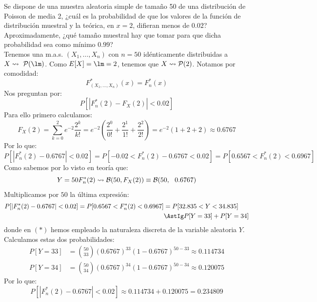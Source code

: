 \begin{ejercicio}
    Se dispone de una muestra aleatoria simple de tamaño 50 de una distribución de Poisson de media 2, ¿cuál es la probabilidad de que los valores de la función de distribución muestral y la teórica, en $x=2$, difieran menos de $0.02$? Aproximadamente, ¿qué tamaño muestral hay que tomar para que dicha probabilidad sea como mínimo $0.99$?\\

    \noindent
    Tenemos una m.a.s. $(X_1, \ldots, X_n)$ con $n=50$ idénticamente distribuidas a $X\rightsquigarrow~\cc{P}(\lm)$. Como $E[X] = \lm = 2$, tenemos que $X\rightsquigarrow \mathcal{P}(2)$. Notamos por comodidad:
    \begin{equation*}
        F_{(X_1, \ldots, X_n)}^\ast(x) = F_n^\ast(x)
    \end{equation*}
    Nos preguntan por:
    \begin{equation*}
        P[|F_n^\ast(2) - F_X(2)| < 0.02]
    \end{equation*}
    Para ello primero calculamos:
    \begin{equation*}
        F_X(2) = \sum_{k=0}^{2} e^{-2}\dfrac{2^k}{k!} =  e^{-2}\left(\dfrac{2^0}{0!} + \dfrac{2^1}{1!} + \dfrac{2^2}{2!}\right) = e^{-2} (1+2+2) \approx 0.6767
    \end{equation*}
    Por lo que:
    \begin{equation*}
        P[|F_n^\ast(2) - 0.6767| < 0.02] = P[-0.02 < F_n^\ast(2) - 0.6767 < 0.02] = P[0.6567 < F_n^\ast(2) < 0.6967]
    \end{equation*}
    Como sabemos por lo visto en teoría que:
    \begin{equation*}
        Y = 50F_n^\ast(2) \rightsquigarrow \cc{B}(50, F_X(2)) \equiv \cc{B}(50,\ \ 0.6767)
    \end{equation*}
    Multiplicamos por $50$ la última expresión:
    \begin{align*}
        P[|F_n^\ast(2) - 0.6767| < 0.02] = P[0.6567 < F_n^\ast(2) < 0.6967] &= P[32.835 < Y< 34.835] \\
                                         &\AstIg P[Y = 33] + P[Y=34]
    \end{align*}
    donde en $(\ast)$ hemos empleado la naturaleza discreta de la variable aleatoria $Y$. Calculamos estas dos probabilidades:
    \begin{align*}
        P[Y=33] &= \binom{50}{33} {(0.6767)}^{33} {(1-0.6767)}^{50-33} \approx 0.114734\\
        P[Y=34] &= \binom{50}{34} {(0.6767)}^{34} {(1-0.6767)}^{50-34} \approx 0.120075
    \end{align*}
    Por lo que:
    \begin{equation*}
        P[|F_n^\ast(2) - 0.6767| < 0.02] \approx 0.114734 + 0.120075 = 0.234809
    \end{equation*}


\end{ejercicio}
